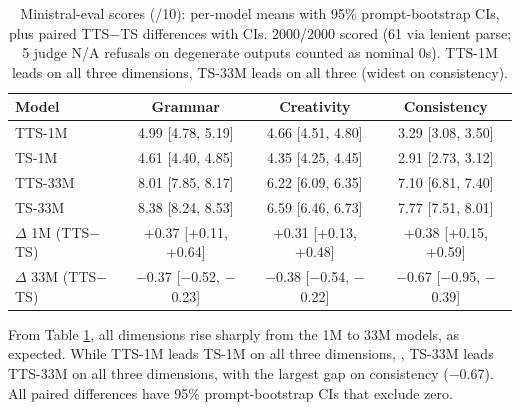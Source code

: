 \documentclass{article}
\newif\ifmarkup
\DeclareRobustCommand{\ins}[1]{\ifmarkup\textbf{#1}\else#1\fi}
\DeclareRobustCommand{\del}[1]{\ifmarkup\sout{#1}\fi}
\begin{document}
\begin{table}[H]
  \centering
  \footnotesize
  \begin{tabular}{@{}lccc@{}}
    \toprule
    Model & Grammar & Creativity & Consistency \\
    \midrule
    TTS-1M & 4.99 [4.78, 5.19] & 4.66 [4.51, 4.80] & 3.29 [3.08, 3.50] \\
    TS-1M & 4.61 [4.40, 4.85] & 4.35 [4.25, 4.45] & 2.91 [2.73, 3.12] \\
    TTS-33M & 8.01 [7.85, 8.17] & 6.22 [6.09, 6.35] & 7.10 [6.81, 7.40] \\
    TS-33M & 8.38 [8.24, 8.53] & 6.59 [6.46, 6.73] & 7.77 [7.51, 8.01] \\
    \midrule
    $\Delta$ 1M (TTS$-$TS) & +0.37 [+0.11, +0.64] & +0.31 [+0.13, +0.48] & +0.38 [+0.15, +0.59] \\
    $\Delta$ 33M (TTS$-$TS) & $-$0.37 [$-$0.52, $-$0.23] & $-$0.38 [$-$0.54, $-$0.22] & $-$0.67 [$-$0.95, $-$0.39] \\
    \bottomrule
  \end{tabular}
  \caption{Ministral-eval scores (/10): per-model means with 95\%
  prompt-bootstrap CIs, plus paired TTS$-$TS differences with CIs.
  2000/2000 scored (61 via lenient parse; 5 judge N/A refusals on
  degenerate outputs counted as nominal 0s). TTS-1M leads on all three
  dimensions, TS-33M leads on all three (widest on consistency).}
  \label{tab:misteval}
\end{table}

From Table \ref{tab:misteval}, all dimensions rise sharply from the 1M to 33M models, as expected. While TTS-1M leads TS-1M on all three dimensions, \del{with the largest gap on grammar (+0.37)}, TS-33M leads TTS-33M on all three dimensions, with the largest gap on consistency ($-$0.67). All paired differences have 95\% prompt-bootstrap CIs that exclude zero\del{, indicating that the differences are statistically significant}. \del{Overall, the results suggest that models trained on TTS are competitive with the released TS models in terms of qualitative generation quality.}
\end{document}
